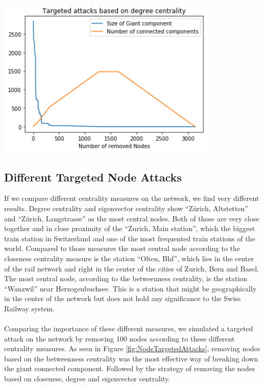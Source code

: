 \documentclass{Resources/netsci-project}
\begin{document}
\begin{center}
    \centering
    \includegraphics[width=300pt]{Resources/node_targeted_degree_attacks}
    \label{fig:NodeTargetedDegreeAttacks}
\end{center}


\subsection{Different Targeted Node Attacks}
If we compare different centrality measures on the network, we find very different results. Degree centrality and eigenvector centrality show “Zürich, Altstetten” and “Zürich, Langstrasse” as the most central nodes. Both of those are very close together and in close proximity of the “Zurich, Main station”, which the biggest train station in Switzerland and one of the most frequented train stations of the world. Compared to those measures the most central node according to the closeness centrality measure is the station “Olten, Bhf”, which lies in the center of the rail network and right in the center of the cities of Zurich, Bern and Basel. The most central node, according to the betweenness centrality, is the station “Wanzwil” near Herzogenbuchsee. This is a station that might be geographically in the center of the network but does not hold any significance to the Swiss Railway system.
\\~\\
Comparing the importance of these different measures, we simulated a targeted attack on the network by removing 100 nodes according to these different centrality measures. As seen in Figure \ref{fig:NodeTargetedAttacks}, removing nodes based on the betweenness centrality was the most effective way of breaking down the giant connected component. Followed by the strategy of removing the nodes based on closeness, degree and eigenvector centrality.
\end{document}
